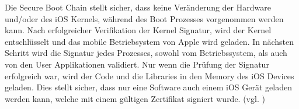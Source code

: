 Die Secure Boot Chain stellt sicher, dass keine Veränderung der Hardware und/oder des iOS Kernels, während des Boot Prozesses vorgenommen werden kann. Nach erfolgreicher Verifikation der Kernel Signatur, wird der Kernel entschlüsselt und das mobile Betriebsystem von Apple wird geladen. In nächsten Schritt wird die Signatur jedes Prozesses, sowohl vom Betriebssystem, als auch von den User Applikationen validiert. Nur wenn die Prüfung der Signatur erfolgreich war, wird der Code und die Libraries in den Memory des iOS Devices geladen. Dies stellt sicher, dass nur eine Software auch einem iOS Gerät geladen werden kann, welche mit einem gültigen Zertifikat signiert wurde. (vgl. \cite{Apple[4], Apple[5], Apple[6]})

%
%
%
%


